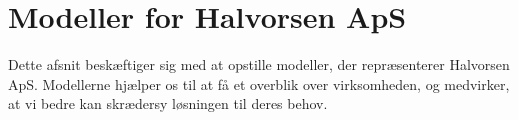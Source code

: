\section{Modeller for Halvorsen ApS}\label{businessmodellering}
Dette afsnit beskæftiger sig med at opstille modeller, der repræsenterer Halvorsen ApS.
Modellerne hjælper os til at få et overblik over virksomheden, og medvirker, at vi bedre kan skrædersy løsningen til deres behov.




\begin{comment}
\subsection{Objekt- og Domænemodeller}
\subsubsection{Objektmodellen}
Halvorsen ApS er et firma med mange ansatte, og et strengt hieraki imellem dem.

Det er derfor nødvendigt at differentiere imellem jobstillinger indenfor firmaet.

Udover personalet skal der differentieres mellem forskellige byggepladser.
 
Der er på et givent tidspunkt en til flere byggepladser, og de skal alle sammen registreres til en eller flere sager, og skal så vidt adskilles. 

Det individuelle sager er adskilt med et sagsid. Et eksempel på en sag, ses på objektet "Tagmontering Etape 1". 

I den sag ser man en forbindelse til byggepladsen, hvor tagmonteringen foregår, og yderligere en forbindelse til svenden Torben, som netop er ude og montere tagene. 

Derudover er objekterne sat op med forbindelser, for hvad de har direkte kontakt med.

Her er selvfølgelig udelukket irrelevante faktorer, som fx. at de alle sammen snakker sammen til årets julefrokost. 
\subsubsection Domænemodellen
Ved et første øjekast på domænemodellen, vil man lægge mærke til, at sekretæren kun har ét forhold. Dette forhold defineres ved en én til én forbindelse til tømrermesteren. Som en af de primære brugere af programmet, kan hun derigennem få fuld adgang til resten af firmaet gennem netop tømrermesteren.
\end{comment}
